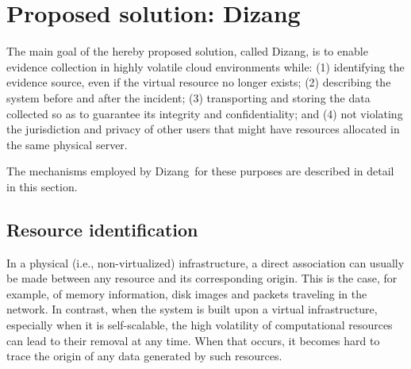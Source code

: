 \documentclass[conference]{IEEEtran}
\newcommand{\fancyname}{Dizang}
\begin{document}
\section{Proposed solution: \fancyname}
\label{sec:proposal}

The main goal of the hereby proposed solution, called \fancyname, is to enable evidence collection in highly volatile cloud environments while:
(1) identifying the evidence source, even if the virtual resource no longer exists; 
(2) describing the system before and after the incident;
(3) transporting and storing the data collected so as to guarantee its integrity and confidentiality; and
(4) not violating the jurisdiction and privacy of other users that might have resources allocated in the same physical server.


The mechanisms employed by \fancyname\ for these purposes are described in detail in this section.


\subsection{Resource identification}
\label{sec:proposal-desc-id}

In a physical (i.e., non-virtualized) infrastructure, a direct association can usually be made between any resource and its corresponding origin.
%
This is the case, for example, of memory information, disk images and packets traveling in the network.
%
In contrast, when the system is built upon a virtual infrastructure, especially when it is self-scalable, the high volatility of computational resources can lead to their removal at any time.
%
When that occurs, it becomes hard to trace the origin of any data generated by such resources.
\end{document}
